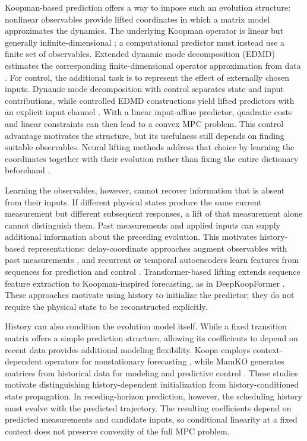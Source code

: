 \documentclass[journal]{IEEEtran}
\begin{document}
Koopman-based prediction offers a way to impose such an evolution structure: nonlinear observables provide lifted coordinates in which a matrix model approximates the dynamics. The underlying Koopman operator is linear but generally infinite-dimensional \cite{koopman1931hamiltonian,mezic2005spectral,brunton2022modern}; a computational predictor must instead use a finite set of observables. Extended dynamic mode decomposition (EDMD) estimates the corresponding finite-dimensional operator approximation from data \cite{williams2015data}. For control, the additional task is to represent the effect of externally chosen inputs. Dynamic mode decomposition with control separates state and input contributions, while controlled EDMD constructions yield lifted predictors with an explicit input channel \cite{proctor2016dmdc,korda2018linear}. With a linear input-affine predictor, quadratic costs and linear constraints can then lead to a convex MPC problem. This control advantage motivates the structure, but its usefulness still depends on finding suitable observables. Neural lifting methods address that choice by learning the coordinates together with their evolution rather than fixing the entire dictionary beforehand \cite{takeishi2017koopman,lusch2018deep,otto2019linearly,han2020deep}.

Learning the observables, however, cannot recover information that is absent from their inputs. If different physical states produce the same current measurement but different subsequent responses, a lift of that measurement alone cannot distinguish them. Past measurements and applied inputs can supply additional information about the preceding evolution. This motivates history-based representations: delay-coordinate approaches augment observables with past measurements \cite{kamb2020timedelay,das2019delay}, and recurrent or temporal autoencoders learn features from sequences for prediction and control \cite{han2024robust,shenoy2025temporal}. Transformer-based lifting extends sequence feature extraction to Koopman-inspired forecasting, as in DeepKoopFormer \cite{forootani2026deepkoopformer}. These approaches motivate using history to initialize the predictor; they do not require the physical state to be reconstructed explicitly.

History can also condition the evolution model itself. While a fixed transition matrix offers a simple prediction structure, allowing its coefficients to depend on recent data provides additional modeling flexibility. Koopa employs context-dependent operators for nonstationary forecasting \cite{liu2023koopa}, while MamKO generates matrices from historical data for modeling and predictive control \cite{li2025mamko}. These studies motivate distinguishing history-dependent initialization from history-conditioned state propagation. In receding-horizon prediction, however, the scheduling history must evolve with the predicted trajectory. The resulting coefficients depend on predicted measurements and candidate inputs, so conditional linearity at a fixed context does not preserve convexity of the full MPC problem.
\end{document}
